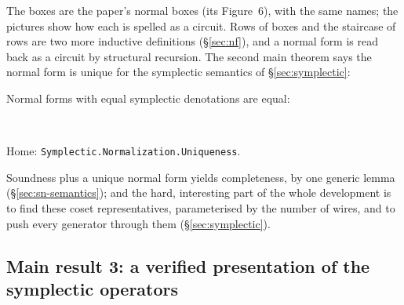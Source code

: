 \medskip\noindent
The boxes are the paper's normal boxes (its Figure~6), with the same
names; the pictures show how each is spelled as a circuit.  Rows of
boxes and the staircase of rows are two more inductive definitions
(\S\ref{sec:nf}), and a normal form is read back as a circuit by
structural recursion.  The second main theorem says the normal form is
unique for the symplectic semantics of \S\ref{sec:symplectic}:

\begin{theorem}\label{thm:unique}
Normal forms with equal symplectic denotations are equal:
\begin{code}%
\>[0]\AgdaSpace{}%
\AgdaSymbol{:}\AgdaSpace{}%
\AgdaSpace{}%
\AgdaSpace{}%
\AgdaSymbol{\{}\AgdaSpace{}%
\AgdaSpace{}%
\AgdaSymbol{:}\AgdaSpace{}%
\AgdaSpace{}%
\AgdaSymbol{\}}\AgdaSpace{}%
\AgdaSpace{}%
\AgdaSpace{}%
\AgdaOperator{\AgdaPostulate{[}}\AgdaSpace{}%
\AgdaSpace{}%
\AgdaOperator{\AgdaPostulate{]}}\AgdaSpace{}%
\AgdaSpace{}%
\AgdaSpace{}%
\AgdaSpace{}%
\AgdaOperator{\AgdaPostulate{[}}\AgdaSpace{}%
\AgdaSpace{}%
\AgdaOperator{\AgdaPostulate{]}}\AgdaSpace{}%
\AgdaSpace{}%
\AgdaSpace{}%
\AgdaSpace{}%
\AgdaSpace{}%
\<%
\\
\>[0]\AgdaSpace{}%
\AgdaSymbol{=}\AgdaSpace{}%
\<%
\end{code}
\noindent Home: \texttt{Symplectic.Normalization.Uniqueness}.
\end{theorem}

Soundness plus a unique normal form yields completeness, by one generic
lemma (\S\ref{sec:sn-semantics}); and the hard, interesting part of the
whole development is to find these coset representatives, parameterised
by the number of wires, and to push every generator through them
(\S\ref{sec:symplectic}).

\subsection{Main result 3: a verified presentation of the symplectic operators}\label{sec:main3}

